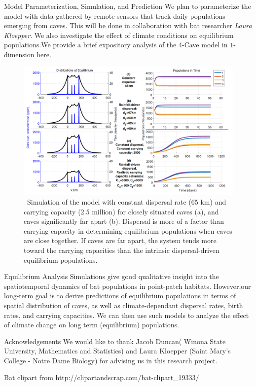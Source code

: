 \documentclass[final]{beamer}
\newlength{\colwidth}
\begin{document}
\begin{frame}[t]
\begin{columns}[t]
\begin{column}{\colwidth}
  \begin{block}{Model Parameterization, Simulation, and Prediction}
We plan to parameterize the model with data gathered by remote sensors that track daily populations emerging from caves.  This will be done in collaboration with bat researcher \textit{Laura Kloepper}. We also investigate the effect of climate conditions on equilibrium populations.We provide a brief expository analysis of the $4$-Cave model in $1$-dimension here.
 \begin{figure}
 \includegraphics[width = 30cm]{fullmodel.png}
 \caption{\ Simulation of the model with constant dispersal rate (65 km) and carrying capacity (2.5
million) for closely situated caves (a), and caves significantly far apart (b). Dispersal is more of a factor than
carrying capacity in determining equilibrium populations when caves are close together. If caves are far
apart, the system tends more toward the carrying capacities than the intrinsic dispersal-driven equilibrium
populations.}
 \end{figure}
  \end{block}
  \begin{block}{Equilibrium Analysis }
    Simulations give good qualitative insight into the spatiotemporal dynamics of bat
 populations in point-patch habitats. However,our long-term goal is to derive predictions of equilibrium populations in terms of spatial distribution of caves, as well as climate-dependant dispersal rates, birth rates, and carrying capacities. We can then use such models to analyze the effect of  climate change on long term (equilibrium) populations. 
  \end{block}
  \begin{block}{Acknowledgements}
   We would like to thank Jacob Duncan( Winona State University, Mathematics and Statistics) and Laura Kloepper (Saint Mary's College - Notre Dame Biology) for advising us in this research project.
   
   Bat clipart from http://clipartandscrap.com/bat-clipart_19333/
  \end{block}
\end{column}

\end{columns}
\end{frame}
\end{document}
